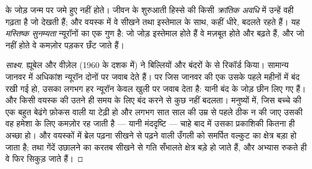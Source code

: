 \begin{proposition}[सुनम्यता]\label{prop:g11:vision-and-brain:plasticity}
 के जोड़ जन्म पर जमे हुए नहीं होते। जीवन के शुरुआती हिस्से की
किसी \emph{क्रांतिक अवधि} में उन्हें वही गढ़ता है जो  देखती हैं; और
वयस्क में वे सीखने तथा इस्तेमाल के साथ, कहीं धीरे, बदलते रहते हैं। यह
\emph{मस्तिष्क सुनम्यता} न्यूरॉनों का एक गुण है:
जो जोड़ इस्तेमाल होते हैं वे मज़बूत होते और बढ़ते हैं, और जो नहीं होते वे
कमज़ोर पड़कर छँट जाते हैं।
\end{proposition}
\begin{proof}[साक्ष्य]
ह्यूबेल और वीज़ेल (1960 के दशक में) ने बिल्लियों और बंदरों के 
से रिकॉर्ड किया। सामान्य जानवर में अधिकांश न्यूरॉन दोनों  पर जवाब देते
हैं। पर जिस जानवर की एक  उसके पहले महीनों में बंद रखी गई हो, उसका लगभग
हर न्यूरॉन केवल खुली  पर जवाब देता है: यानी बंद  के जोड़ छीन लिए गए
हैं। और किसी वयस्क की  उतने ही समय के लिए बंद करने से कुछ नहीं बदलता।
मनुष्यों में, जिस बच्चे की एक  बहुत बेढंगे फ़ोकस वाली या टेढ़ी हो और
लगभग सात साल की उम्र से पहले ठीक न की जाए उसकी वह  हमेशा के लिए कमज़ोर
रह जाती है --- यानी मंददृष्टि --- चाहे बाद में उसका प्रकाशिकी कितना ही
अच्छा हो। और वयस्कों में ब्रेल पढ़ना सीखने से पढ़ने वाली उँगली को समर्पित
वल्कुट का क्षेत्र बड़ा हो जाता है; तथा गेंदें उछालने का करतब सीखने से गति
सँभालते क्षेत्र बड़े हो जाते हैं, और अभ्यास रुकते ही वे फिर सिकुड़ जाते
हैं।
\end{proof}

